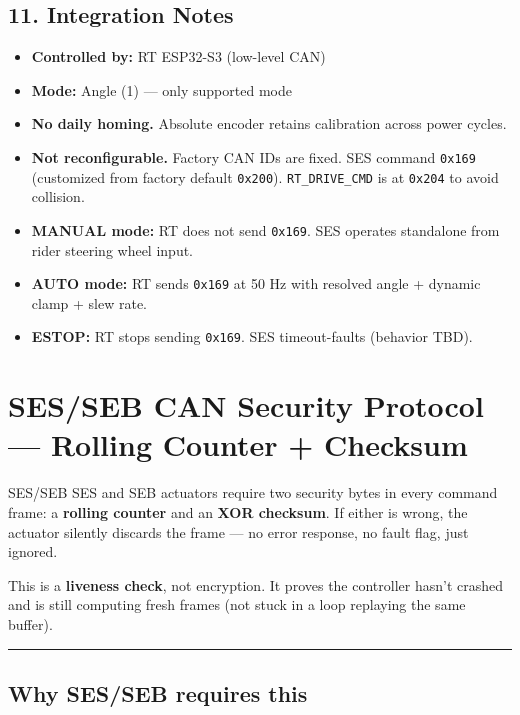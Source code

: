 \documentclass[12pt,a4paper,oneside]{report}
\providecommand{\tightlist}{\setlength{\itemsep}{0pt}\setlength{\parskip}{0pt}}
\begin{document}
\section{11. Integration Notes}\label{integration-notes}

\begin{itemize}
\tightlist
\item
  \textbf{Controlled by:} RT ESP32-S3 (low-level CAN)
\item
  \textbf{Mode:} Angle (1) --- only supported mode
\item
  \textbf{No daily homing.} Absolute encoder retains calibration across power
  cycles.
\item
  \textbf{Not reconfigurable.} Factory CAN IDs are fixed. SES command
  \texttt{0x169} (customized from factory default \texttt{0x200}).
  \texttt{RT\_DRIVE\_CMD} is at \texttt{0x204} to avoid collision.
\item
  \textbf{MANUAL mode:} RT does not send \texttt{0x169}. SES operates
  standalone from rider steering wheel input.
\item
  \textbf{AUTO mode:} RT sends \texttt{0x169} at 50 Hz with resolved angle +
  dynamic clamp + slew rate.
\item
  \textbf{ESTOP:} RT stops sending \texttt{0x169}. SES timeout-faults
  (behavior TBD).
\end{itemize}


\chapter{SES/SEB CAN Security Protocol --- Rolling Counter +
Checksum}\label{SES/SEB-can-security-protocol-rolling-counter-checksum}

SES/SEB SES and SEB actuators require two security bytes in every command
frame: a \textbf{rolling counter} and an \textbf{XOR checksum}. If either is
wrong, the actuator silently discards the frame --- no error response, no fault
flag, just ignored.

This is a \textbf{liveness check}, not encryption. It proves the controller
hasn't crashed and is still computing fresh frames (not stuck in a loop
replaying the same buffer).

\begin{center}\rule{0.5\linewidth}{0.5pt}\end{center}

\section{Why SES/SEB requires this}\label{why-SES/SEB-requires-this}
\end{document}
